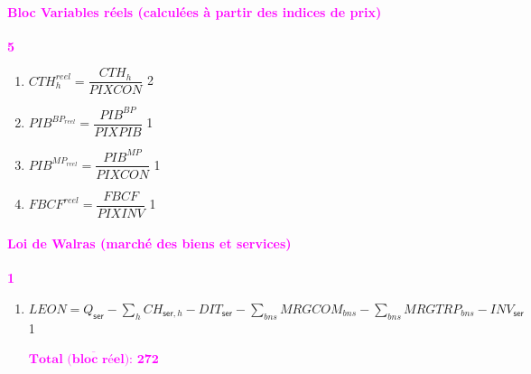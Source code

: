 \documentclass[11pt,a4paper]{article}
\newcommand{\bns}{\mathit{bns}}
\newcommand{\ser}{\mathsf{ser}}
\newcommand{\CH}{\mathit{CH}}
\newcommand{\CTH}{\mathit{CTH}}
\newcommand{\DIT}{\mathit{DIT}}
\newcommand{\FBCF}{\mathit{FBCF}}
\newcommand{\INV}{\mathit{INV}}
\newcommand{\LEON}{\mathit{LEON}}
\newcommand{\MRGCOM}{\mathit{MRGCOM}}
\newcommand{\MRGTRP}{\mathit{MRGTRP}}
\newcommand{\PIB}{\mathit{PIB}}
\newcommand{\PIXCON}{\mathit{PIXCON}}
\newcommand{\PIXINV}{\mathit{PIXINV}}
\newcommand{\PIXPIB}{\mathit{PIXPIB}}
\newcommand{\redparagraph}[1]{\paragraph*{\large\textcolor{Fuchsia}{#1}}}
\begin{document}
	
	\redparagraph{Bloc Variables réels (calculées à partir des indices de prix)}\hfill \textcolor{Fuchsia}{\textbf{5}} 
	\begin{enumerate}[itemsep=2pt,label=\textbf{eq\arabic*}.,resume,  ref=\textbf{eq\arabic*}]
		
		\item $ \CTH_h^{\mathit{reel}} = \dfrac{\CTH_h}{\PIXCON}$ \hfill 2 
		
		\item $ \PIB^{\mathit{BP}_\mathit{reel}} = \dfrac{\PIB^{BP}}{\PIXPIB}$ \hfill 1 
		
		\item $ \PIB^{\mathit{MP}_\mathit{reel}} = \dfrac{\PIB^{MP}}{\PIXCON}$ \hfill 1 
		
		\item $ \FBCF^{\mathit{reel}} = \dfrac{\FBCF}{\PIXINV}$ \hfill 1 		
		
	\end{enumerate}	
	
	
	\redparagraph{Loi de Walras (marché des biens et services)}\hfill \textcolor{Fuchsia}{\textbf{1}} 
	\begin{enumerate}[itemsep=2pt,label=\textbf{eq\arabic*}.,resume,  ref=\textbf{eq\arabic*}]
		
		\item $\LEON  = Q_{\ser}  - \sum_{h} \CH_{\ser,h} - \DIT_{\ser}	 -  \sum_{\bns}\MRGCOM_{\bns} - \sum_{\bns}\MRGTRP_{\bns} - \INV_{\ser}$ \label{it:walras} \hfill 1
		
		\hfill \textcolor{Fuchsia}{$\overline{\textbf{Total (bloc réel): 272}}$}
	\end{enumerate}
	
\end{document}
